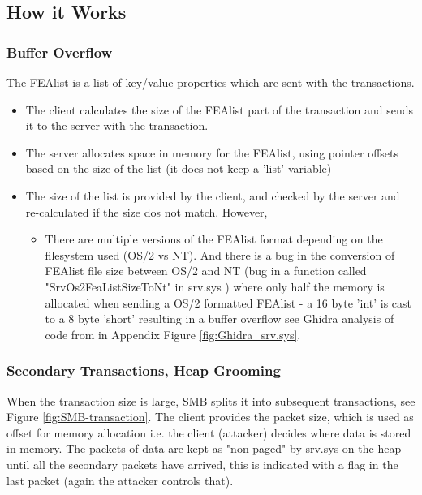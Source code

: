 \documentclass[
	letterpaper, %
	10pt, %
	unnumberedsections, %
	twoside, %
]{LTJournalArticle}
\begin{document}
\subsection{How it Works}

\subsubsection{Buffer Overflow}
The FEAlist is a list of key/value properties which are sent with the transactions. 

\begin{itemize}
	\item The client calculates the size of the FEAlist part of the transaction and sends it to the server with the transaction.  
	\item The server allocates space in memory for the FEAlist, using pointer offsets based on the size of the list (it does not keep a 'list' variable)
	\item The size of the list is provided by the client, and checked by the server and re-calculated if the size dos not match. However, 
	\begin{itemize}
		\item There are multiple versions of the FEAlist format depending on the filesystem used (OS/2 vs NT). And there is a bug in the conversion of FEAlist file size between OS/2 and NT (bug in a function called "SrvOs2FeaListSizeToNt" in srv.sys \cite{h3xduck}) where only half the memory is allocated when sending a OS/2 formatted FEAlist - a 16 byte 'int' is cast to a 8 byte 'short' resulting in a buffer overflow see Ghidra analysis of code from \cite{h3xduck} in Appendix Figure \ref{fig:Ghidra_srv.sys}. 
	\end{itemize}
\end{itemize}


\subsubsection{Secondary Transactions, Heap Grooming}
When the transaction size is large, SMB splits it into subsequent transactions, see Figure \ref{fig:SMB-transaction}. The client provides the packet size, which is used as offset for memory allocation i.e. the client (attacker) decides where data is stored in memory. The packets of data are kept as "non-paged" by srv.sys on the heap until all the secondary packets have arrived, this is indicated with a flag in the last packet (again the attacker controls that). 
\end{document}
